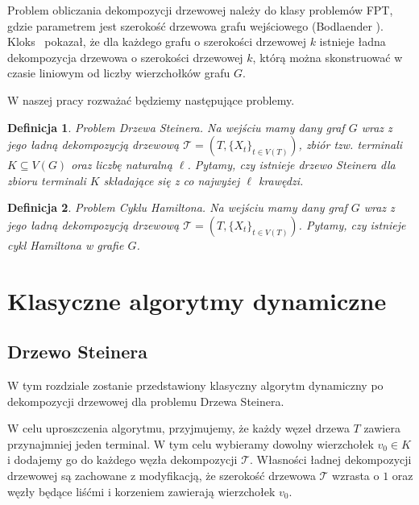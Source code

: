 \documentclass[12pt, oneside]{report}
\newtheorem{definition}{Definicja}
\begin{document}
Problem obliczania dekompozycji drzewowej należy do klasy problemów FPT, gdzie parametrem jest szerokość drzewowa grafu wejściowego (Bodlaender \cite{bodlaender}). Kloks~\cite{kloks} pokazał, że dla każdego grafu o szerokości drzewowej $k$ istnieje ładna dekompozycja drzewowa o szerokości drzewowej $k$, którą można skonstruować w czasie liniowym od liczby wierzchołków grafu $G$.

W naszej pracy rozważać będziemy następujące problemy.

\begin{definition}
\em \emph{Problem Drzewa Steinera.} Na wejściu mamy dany graf $G$ wraz z jego ładną dekompozycją drzewową $\mathcal{T} = (T, \{X_t\}_{t \in V(T)})$, zbiór tzw. terminali $K \subseteq V(G)$ oraz liczbę naturalną $\ell$. Pytamy, czy istnieje drzewo Steinera dla zbioru terminali $K$ składające się z co najwyżej $\ell$ krawędzi.
\end{definition}

\begin{definition}
\em \emph{Problem Cyklu Hamiltona.} Na wejściu mamy dany graf $G$ wraz z jego ładną dekompozycją drzewową $\mathcal{T} = (T, \{X_t\}_{t \in V(T)})$. Pytamy, czy istnieje cykl Hamiltona w grafie $G$.
\end{definition}

\newpage
  	\chapter{Klasyczne algorytmy dynamiczne}
    	\section{Drzewo Steinera}
    	
W tym rozdziale zostanie przedstawiony klasyczny algorytm dynamiczny po dekompozycji drzewowej dla problemu Drzewa Steinera.

W celu uproszczenia algorytmu, przyjmujemy, że każdy węzeł drzewa $T$ zawiera przynajmniej jeden terminal. W tym celu wybieramy dowolny wierzchołek $v_0 \in K$ i dodajemy go do każdego węzła dekompozycji $\mathcal{T}$. Własności ładnej dekompozycji drzewowej są zachowane z modyfikacją, że szerokość drzewowa $\mathcal{T}$ wzrasta o $1$ oraz węzły będące liśćmi i korzeniem zawierają wierzchołek $v_0$.
\end{document}

